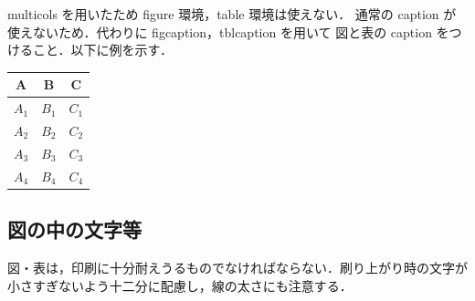 \begin{multicols}{2}
multicols を用いたため figure 環境，table 環境は使えない．
通常の caption が使えないため．代わりに figcaption，tblcaption を用いて
図と表の caption をつけること．以下に例を示す．

\begin{center}
\label{fig:VFS}
\end{center}
\label{tab:cost2}
\begin{center}
\begin{tabular}{|c|c|c|} \hline
A & B & C \\ \hline
$A_{1}$ & $B_{1}$ & $C_{1}$ \\ \hline
$A_{2}$ & $B_{2}$ & $C_{2}$ \\ \hline
$A_{3}$ & $B_{3}$ & $C_{3}$ \\ \hline
$A_{4}$ & $B_{4}$ & $C_{4}$ \\ \hline
\end{tabular}
\end{center}

\subsection{図の中の文字等}
 図・表は，印刷に十分耐えうるものでなければならない．刷り上がり時の文字が小さすぎないよう十二分に配慮し，線の太さにも注意する．


\end{multicols}
